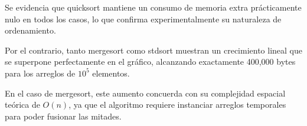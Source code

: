 Se evidencia que quicksort mantiene un consumo de memoria extra prácticamente nulo en todos los casos, lo que confirma experimentalmente su naturaleza de ordenamiento.

Por el contrario, tanto mergesort como stdsort muestran un crecimiento lineal que se superpone perfectamente en el gráfico, alcanzando exactamente 400,000 bytes para los arreglos de $10^5$ elementos.

En el caso de mergesort, este aumento concuerda con su complejidad espacial teórica de $O(n)$, ya que el algoritmo requiere instanciar arreglos temporales para poder fusionar las mitades.